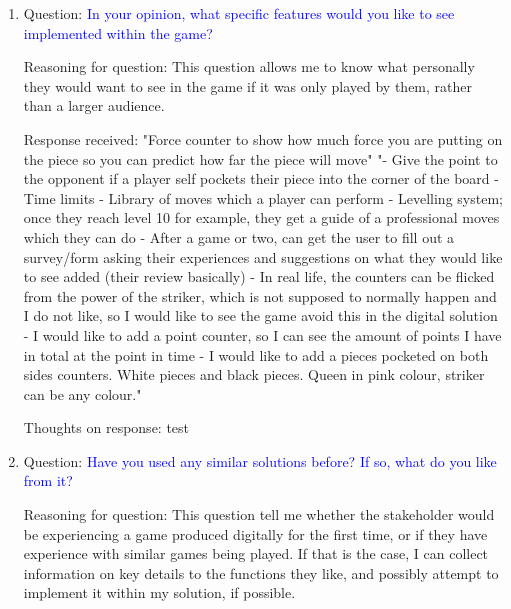 \documentclass[11pt,a4paper]{report}
\begin{document}
\begin{enumerate}
    \colorbox{l-purple}{Thoughts on response:} \noindent \textcolor{d-purple}{test}




    \item \colorbox{l-blue}{Question:} \textcolor{blue}{In your opinion, what specific features would you like to see implemented within the game?}

    \colorbox{l-green}{Reasoning for question:} \textcolor{dark-green}{This question allows me to know what personally they would want to see in the game if it was only played by them, rather than a larger audience.}

    \colorbox{l-red}{Response received:} \noindent \textcolor{crimson-red}{"Force counter to show how much force you are putting on the piece so you can predict how far the piece will move" \newline "- Give the point to the opponent if a player self pockets their piece into the corner of the board
- Time limits
- Library of moves which a player can perform
- Levelling system; once they reach level 10 for example, they get a guide of a professional moves which they can do
- After a game or two, can get the user to fill out a survey/form asking their experiences and suggestions on what they would like to see added (their review basically)
- In real life, the counters can be flicked from the power of the striker, which is not supposed to normally happen and I do not like, so I would like to see the game avoid this in the digital solution
- I would like to add a point counter, so I can see the amount of points I have in total at the point in time
- I would like to add a pieces pocketed on both sides counters. White pieces and black pieces. Queen in pink colour, striker can be any colour."}

    \colorbox{l-purple}{Thoughts on response:} \noindent \textcolor{d-purple}{test}





    \item \colorbox{l-blue}{Question:} \textcolor{blue}{Have you used any similar solutions before? If so, what do you like from it?}

    \colorbox{l-green}{Reasoning for question:} \textcolor{dark-green}{This question tell me whether the stakeholder would be experiencing a game produced digitally for the first time, or if they have experience with similar games being played. If that is the case, I can collect information on key details to the functions they like, and possibly attempt to implement it within my solution, if possible.}


\end{enumerate}
\end{document}
